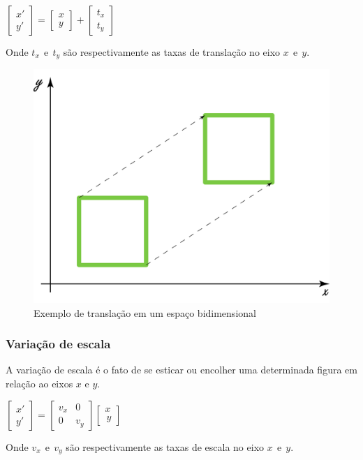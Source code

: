 \documentclass[9pt, a4paper, nofonttune, journal]{IEEEtran}
\begin{document}
\begin{center}
$\begin{bmatrix}x'\\
y'
\end{bmatrix}=\begin{bmatrix}x\\
y
\end{bmatrix}+\begin{bmatrix}t_{x}\\
t_{y}
\end{bmatrix}$\end{center}
Onde $t_{x}~~ \textrm{e} ~~ t_{y}$ são respectivamente as taxas de translação no eixo $x~~ \textrm{e} ~~y$.\cite{CGPPBook1}


\begin{figure}[H]
\begin{center}
\includegraphics[scale=0.25]{figuras/translation1}
\caption{Exemplo de translação em um espaço bidimensional}
\end{center}
\end{figure}

\subsubsection{Variação de escala}

A variação de escala é o fato de se esticar ou encolher uma determinada figura em relação ao eixos $x$ e $y$.

\begin{center}
$\begin{bmatrix}x'\\
y'
\end{bmatrix}=\begin{bmatrix}v_{x} & 0\\
0 & v_{y}
\end{bmatrix}\begin{bmatrix}x\\
\frac{}{}y
\end{bmatrix}$\end{center}
Onde $v_{x}~~ \textrm{e} ~~ v_{y}$ são respectivamente as taxas de escala no eixo $x~~ \textrm{e} ~~y$.\cite{CGPPBook1}
\end{document}
